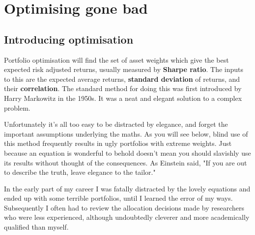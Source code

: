 \begin{chapteroverviewtable}
\end{chapteroverviewtable}

\section*{Optimising gone bad}  {}

\subsection*{Introducing optimisation}

Portfolio optimisation will find the set of asset weights which give the best expected risk adjusted returns, usually measured by \textbf{Sharpe ratio}. The inputs to this are the expected average returns, \textbf{standard deviation} of returns, and their \textbf{correlation}. The standard method for doing this was first introduced by Harry Markowitz in the 1950s. It was a neat and elegant solution to a complex problem.

Unfortunately it's all too easy to be distracted by elegance, and forget the important assumptions underlying the maths. As you will see below, blind use of this method frequently results in ugly portfolios with extreme weights. Just because an equation is wonderful to behold doesn't mean you should slavishly use its results without thought of the consequences. As Einstein said, "If you are out to describe the truth, leave elegance to the tailor."

In the early part of my career I was fatally distracted by the lovely equations and ended up with some terrible portfolios, until I learned the error of my ways. Subsequently I often had to review the allocation decisions made by researchers who were less experienced, although undoubtedly cleverer and more academically qualified than myself.

